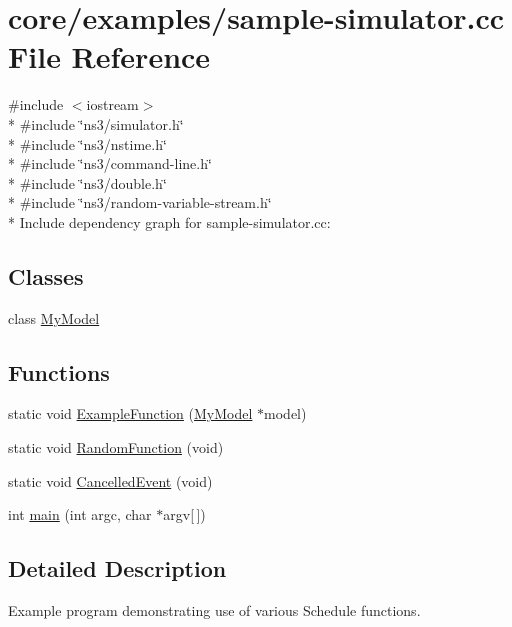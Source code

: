 \hypertarget{sample-simulator_8cc}{}\section{core/examples/sample-\/simulator.cc File Reference}
\label{sample-simulator_8cc}
{\ttfamily \#include $<$iostream$>$}\\*
{\ttfamily \#include \char`\"{}ns3/simulator.\+h\char`\"{}}\\*
{\ttfamily \#include \char`\"{}ns3/nstime.\+h\char`\"{}}\\*
{\ttfamily \#include \char`\"{}ns3/command-\/line.\+h\char`\"{}}\\*
{\ttfamily \#include \char`\"{}ns3/double.\+h\char`\"{}}\\*
{\ttfamily \#include \char`\"{}ns3/random-\/variable-\/stream.\+h\char`\"{}}\\*
Include dependency graph for sample-\/simulator.cc\+:
\subsection*{Classes}
\begin{DoxyCompactItemize}
\item 
class \hyperlink{classMyModel}{My\+Model}
\end{DoxyCompactItemize}
\subsection*{Functions}
\begin{DoxyCompactItemize}
\item 
static void \hyperlink{sample-simulator_8cc_a445145225afdfd0a7f9ec1780b5cd49d}{Example\+Function} (\hyperlink{classMyModel}{My\+Model} $\ast$model)
\item 
static void \hyperlink{sample-simulator_8cc_a935efb5a8a96132ec1ba8bd67487b97b}{Random\+Function} (void)
\item 
static void \hyperlink{sample-simulator_8cc_a9107e2a62541d0024e401df7e1d3a2b0}{Cancelled\+Event} (void)
\item 
int \hyperlink{sample-simulator_8cc_a0ddf1224851353fc92bfbff6f499fa97}{main} (int argc, char $\ast$argv\mbox{[}$\,$\mbox{]})
\end{DoxyCompactItemize}


\subsection{Detailed Description}
Example program demonstrating use of various Schedule functions. 

